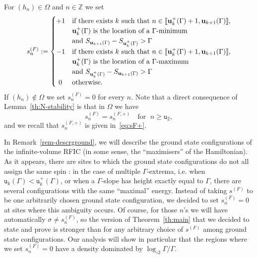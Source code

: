 \documentclass[AHL,Unicode,longabstracts,published]{cedram}
\newcommand{\bfu}{\mathbf{u}}
\newcommand{\bbZ}{\mathbb{Z}}
\newcommand{\gG}{\Gamma}
\newcommand{\gO}{\Omega}
\renewcommand*\ss{\mathtt{u}}
\newcommand{\tu}{\ss}
\newcommand{\loglog}{\log_{\circ 2}}
\newcommand{\llbracket}{\mathopen{[\mkern -2.7mu[}}
\newcommand{\rrbracket}{\mathclose{]\mkern -2.7mu]}}
\newcommand{\lbra}{\llbracket}
\newcommand{\rbra}{\rrbracket}
\begin{document}
For $(h_n) \in \gO$ and $n \in \bbZ$ we set
\begin{equation}\label{eq:sF}
s_n^{(F)}:=
\begin{cases}
+1 & \text{if there exists } k \text{ such that } n \in \lbra\bfu^+_k(\gG)+1, \bfu_{k+1}(\gG)\rbra,
\\ & \bfu^+_k(\gG) \text{ is the location of a }\gG\text{-minimum} \\
&\text{and } S_{ \bfu_{k+1}(\gG)}-S_{\bfu^+_k(\gG)}>\gG
\\
-1 & \text{if there exists } k \text{ such that } n \in \lbra\bfu^+_k(\gG)+1, \bfu_{k+1}(\gG)\rbra,
\\ & \bfu^+_k(\gG) \text{ is the location of a }\gG\text{-maximum}\\
&\text{and } S_{\bfu^+_k(\gG)}-S_{ \bfu_{k+1}(\gG)}>\gG
\\ \ 0 & \text{otherwise.}
\end{cases}
\end{equation}
If $(h_n) \not\in \gO$ we set $s_n^{(F)}=0$ for every $n$. Note that a direct consequence of Lemma~\ref{th:N-stability} is that in $\gO$ we have
\begin{equation}\label{eq:stability-+}
s_n^{(F)}= s_n^{(F,+)} \quad \text{for } \; n \ge \tu_2,
\end{equation}
and we recall that $s_n^{(F,+)}$ is given in~\eqref{eq:sF+}.


\begin{rema}\label{rem:defFisher}
In Remark~\ref{rem-descrground}, we will describe the ground state configurations of the infinite-volume RFIC (in some sense, the ``maximisers'' of the Hamiltonian). As it appears, there are sites to which the ground state configurations do not all assign the same spin : in the case of multiple $\gG$-extrema, i.e. when $\ss_k(\gG)<\ss_k^+(\gG)$, or when a $\gG$-slope has height exactly equal to $\gG$, there are several configurations with the same ``maximal'' energy. Instead of taking $ s^{(F)} $ to be one arbitrarily chosen ground state configuration, we decided to set $s_n^{(F)}= 0$ at sites where this ambiguity occurs. Of course, for those $n$'s we will have automatically $\sigma \neq s_n^{(F)}$, so the version of Theorem~\ref{th:main} that we decided to state and prove is stronger than for any arbitrary choice of $ s^{(F)} $ among ground state configurations. Our analysis will show in particular that the regions where we set $s_n^{(F)}=0$ have a density dominated by ${\loglog\gG}/ \gG$.
\end{rema}
\end{document}
